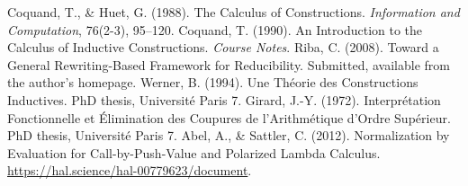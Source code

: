 \documentclass{article}
\theoremstyle{plain}
\theoremstyle{definition}
\begin{document}
\begin{thebibliography}{9}
 Coquand, T., \& Huet, G. (1988). The Calculus of Constructions. \emph{Information and Computation}, 76(2-3), 95--120.
 Coquand, T. (1990). An Introduction to the Calculus of Inductive Constructions. \emph{Course Notes}.
 Riba, C. (2008). Toward a General Rewriting-Based Framework for Reducibility. Submitted, available from the author’s homepage.
 Werner, B. (1994). Une Théorie des Constructions Inductives. PhD thesis, Université Paris 7.
 Girard, J.-Y. (1972). Interprétation Fonctionnelle et Élimination des Coupures de l’Arithmétique d’Ordre Supérieur. PhD thesis, Université Paris 7.
 Abel, A., \& Sattler, C. (2012). Normalization by Evaluation for Call-by-Push-Value and Polarized Lambda Calculus. \url{https://hal.science/hal-00779623/document}.
\end{thebibliography}
\end{document}
